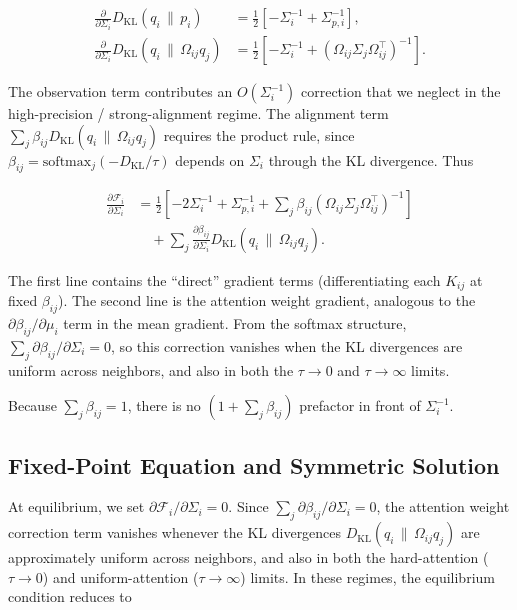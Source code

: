 \documentclass[twoside,11pt]{article}
\begin{document}
\begin{align}
\frac{\partial}{\partial \Sigma_i}
D_{\mathrm{KL}}(q_i \,\|\, p_i)
&=\frac{1}{2}\left[
-\Sigma_i^{-1}
+ \Sigma_{p,i}^{-1}
\right],
\\[6pt]
\frac{\partial}{\partial \Sigma_i}
D_{\mathrm{KL}}(q_i \,\|\, \Omega_{ij} q_j)
&=
\frac{1}{2}\left[
-\Sigma_i^{-1}
+ (\Omega_{ij}\Sigma_j\Omega_{ij}^\top)^{-1}
\right].
\end{align}

The observation term contributes an $O(\Sigma_i^{-1})$ correction that we neglect in the high-precision / strong-alignment regime. The alignment term $\sum_j \beta_{ij} D_{\mathrm{KL}}(q_i \,\|\, \Omega_{ij} q_j)$ requires the product rule, since $\beta_{ij} = \mathrm{softmax}_j(-D_{\mathrm{KL}}/\tau)$ depends on $\Sigma_i$ through the KL divergence. Thus

\begin{equation}
\boxed{
\begin{aligned}
\frac{\partial \mathcal{F}_i}{\partial \Sigma_i}
&=\frac{1}{2}
\left[
-2 \Sigma_i^{-1}
+ \Sigma_{p,i}^{-1}
+ \sum_j \beta_{ij}
(\Omega_{ij}\Sigma_j\Omega_{ij}^\top)^{-1}
\right] \\
&\quad + \sum_j \frac{\partial \beta_{ij}}{\partial \Sigma_i}
D_{\mathrm{KL}}(q_i \,\|\, \Omega_{ij} q_j).
\end{aligned}
}
\label{eq:Sigma_gradient_final}
\end{equation}

The first line contains the ``direct'' gradient terms (differentiating each $K_{ij}$ at fixed $\beta_{ij}$). The second line is the attention weight gradient, analogous to the $\partial \beta_{ij}/\partial \mu_i$ term in the mean gradient. From the softmax structure, $\sum_j \partial \beta_{ij}/\partial \Sigma_i = 0$, so this correction vanishes when the KL divergences are uniform across neighbors, and also in both the $\tau \to 0$ and $\tau \to \infty$ limits.

Because $\sum_j \beta_{ij} = 1$, there is no $(1 + \sum_j \beta_{ij})$ prefactor in front of $\Sigma_i^{-1}$.

\subsection{Fixed-Point Equation and Symmetric Solution}

At equilibrium, we set $\partial \mathcal{F}_i / \partial \Sigma_i = 0$. Since $\sum_j \partial \beta_{ij}/\partial \Sigma_i = 0$, the attention weight correction term vanishes whenever the KL divergences $D_{\mathrm{KL}}(q_i \,\|\, \Omega_{ij}q_j)$ are approximately uniform across neighbors, and also in both the hard-attention ($\tau \to 0$) and uniform-attention ($\tau \to \infty$) limits. In these regimes, the equilibrium condition reduces to
\end{document}
